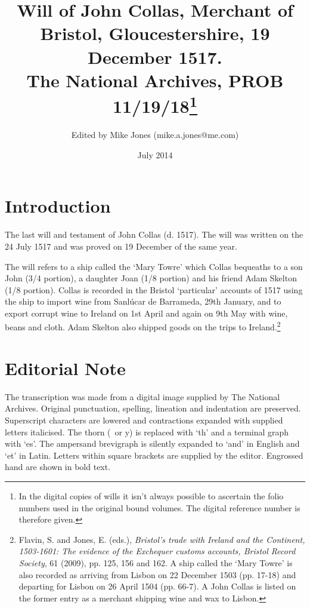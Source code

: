 \documentclass[a4paper,12pt]{article}
\makeatletter
\def\authorname{Mike Jones}
\def\authoremail{mike.a.jones@me.com}
\def\shorttitle{Will of John Collas, Merchant of Bristol, Gloucestershire, 19 December 1517.}
\def\abstract{The last will and testament of John Collas (d. 1517). The will was written on the 24 July 1517 and was proved on 19 December of the same year.}
\def\pubdate{July 2014}
\def\archivename{The National Archives}
\def\archiverefno{PROB 11/19/18}
\makeatother
\begin{document}
\title{\Large \shorttitle\\\normalsize \vspace{1em} \archivename \hspace{0 mm}, \archiverefno\footnote{In the digital copies of wills it isn't always possible to ascertain the folio numbers used in the original bound volumes. The digital reference number is therefore given.} \hspace{1 mm}}\vspace{-5em}
\author{\small Edited by \authorname \hspace{0 mm} (\authoremail)}
\date{\small \pubdate}
\maketitle

\section*{Introduction}
\abstract

The will refers to a ship called the `Mary Towre' which Collas bequeaths to a son John (3/4 portion), a daughter Joan (1/8 portion) and his friend Adam Skelton (1/8 portion). Collas is recorded in the Bristol `particular' accounts of 1517 using the ship to import wine from Sanl\'ucar de Barrameda, 29th January, and to export corrupt wine to Ireland on 1st April and again on 9th May with wine, beans and cloth. Adam Skelton also shipped goods on the trips to Ireland.\footnote{Flavin, S. and Jones, E. (eds.), \textit{Bristol's trade with Ireland and the Continent, 1503-1601: The evidence of the Exchequer customs accounts, Bristol Record Society}, 61 (2009), pp. 125, 156 and 162. A ship called the `Mary Towre' is also recorded as arriving from Lisbon on 22 December 1503 (pp. 17-18) and departing for Lisbon on 26 April 1504 (pp. 66-7). A John Collas is listed on the former entry as a merchant shipping wine and wax to Lisbon.
}

\section*{Editorial Note}

The transcription was made from a digital image supplied by The National Archives. Original punctuation, spelling, lineation and indentation are preserved. Superscript characters are lowered and contractions expanded with supplied letters italicised. The thorn (\th\ or y) is replaced with `th' and a terminal graph with `es'. The ampersand brevigraph is silently expanded to `and' in English and `et' in Latin. Letters within square brackets are supplied by the editor. Engrossed hand are shown in bold text.
\end{document}
